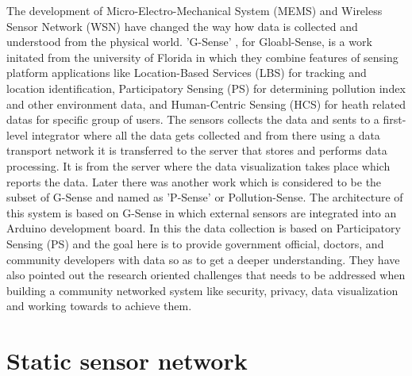 The development of Micro-Electro-Mechanical System (MEMS) and Wireless Sensor Network (WSN) have changed the way how data is collected and understood from the physical world. 'G-Sense' \cite{Perez2010}, for Gloabl-Sense, is a work initated from the university of Florida in which they combine features of sensing platform applications like Location-Based Services (LBS) for tracking and location identification, Participatory Sensing (PS) for determining pollution index and other environment data, and Human-Centric Sensing (HCS) for heath related datas for specific group of users. The sensors collects the data and sents to a first-level integrator where all the data gets collected and from there using a data transport network it is transferred to the server that stores and performs data processing. It is from the server where the data visualization takes place which reports the data. Later there was another work which is considered to be the subset of G-Sense and named as 'P-Sense' \cite{Mendez2011} or Pollution-Sense. The architecture of this system is based on G-Sense in which external sensors are integrated into an Arduino development board. In this the data collection is based on Participatory Sensing (PS) and the goal here is to provide government official, doctors, and community developers with data so as to get a deeper understanding. They have also pointed out the research oriented challenges that needs to be addressed when building a community networked system like security, privacy, data visualization and working towards to achieve them.



\section{Static sensor network}

